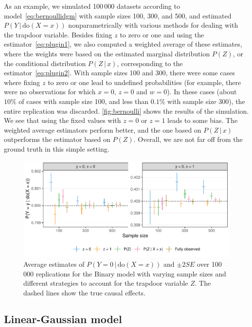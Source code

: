 \documentclass[11pt,a4paper,twoside]{article}
\newcommand{\+}[1]{\ensuremath{\mathbf{#1}}}
\newcommand{\doo}{\textrm{do}}
\newcommand{\given}{{ \, | \, }}
\newcommand{\z}{trapdoor variable}
\begin{document}
	As an example, we simulated 100\,000 datasets according to model~\eqref{eq:bernoullidgm} with sample sizes 100, 300, and 500, and estimated $P(Y\given \doo(X = x))$ nonparametrically with various methods for dealing with the \z. Besides fixing $z$ to zero or one and using the estimator~\eqref{eq:plugin1}, we also computed a weighted average of these estimates, where the weights were based on the estimated marginal distribution $P(Z)$, or the conditional distribution $P(Z \given x)$, corresponding to the estimator~\eqref{eq:plugin2}. With sample sizes 100 and 300, there were some cases where fixing $z$ to zero or one lead to undefined probabilities (for example, there were no observations for which $x = 0$, $z = 0$ and $w = 0$). In these cases (about $10\%$ of cases with sample size 100, and less than $0.1\%$ with sample size 300), the entire replication was discarded. \autoref{fig:bernoulli} shows the results of the simulation. We see that using the fixed values with $z=0$ or $z=1$ leads to some bias. The weighted average estimators perform better, and the one based on $P(Z \given x)$ outperforms the estimator based on $P(Z)$. Overall, we are not far off from the ground truth in this simple setting.
	\begin{figure}[!ht]
		\centering
		\includegraphics[width=\textwidth]{figures/bernoulli.pdf} 
		\caption{Average estimates of $P(Y = 0 \given \doo(X = x))$ and $\pm 2 SE$ over 100\,000 replications for the Binary model with varying sample sizes and different strategies to account for the \z{} $Z$. The dashed lines show the true causal effects.}
		\label{fig:bernoulli}
	\end{figure}
	
	\subsection{Linear-Gaussian model}
	\label{sec:simulation_experiment}
\end{document}

